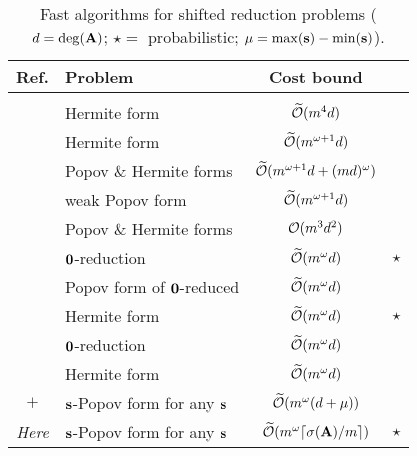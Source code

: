 \documentclass[preprint]{sig-alternate-05-2015}
\begin{document}
\begin{table}[h]
  \scriptsize
  \centering
  \begin{tabular}[h]{cp{3.1cm}cc}
    Ref.                 &  Problem             &  Cost bound                                                &                \\ \hline \\[-0.25cm]
    \cite{HafMcCur91}    & Hermite form         &  $\widetilde{\mathcal{O}}(m^4 d)$                                       &                \\
    \cite{StoLab96}      & Hermite form         &  $\widetilde{\mathcal{O}}(m^{\omega+1} d)$                          &                \\
    \cite{Villard96}     & Popov \& Hermite forms &  $\widetilde{\mathcal{O}}(m^{\omega+1} d + (m d)^\omega)$ &                \\
    \cite{Alekhnovich02,Alekhnovich05} 
                         & weak Popov form & $\widetilde{\mathcal{O}}(m^{\omega+1} d)$                                &                \\
    \cite{MulSto03}      & Popov \& Hermite forms & $\mathcal{O}(m^3 d^2)$                                     &                \\
    \cite{GiJeVi03}      & $\mathbf{0}$-reduction & $\widetilde{\mathcal{O}}(m^\omega d)$                              & $\star$        \\
    \cite{SarSto11}      & Popov form of $\mathbf{0}$-reduced & $\widetilde{\mathcal{O}}(m^\omega d)$                  &                \\
    \cite{GupSto11}      & Hermite form & $\widetilde{\mathcal{O}}(m^{\omega} d)$                                     & $\star$        \\
    \cite{GuSaStVa12}    & $\mathbf{0}$-reduction & $\widetilde{\mathcal{O}}(m^{\omega} d)$                            &                \\
    \cite{ZhoLab16}      & Hermite form & $\widetilde{\mathcal{O}}(m^{\omega} d)$                                     &                \\
    \cite{GuSaStVa12}$+$\cite{SarSto11}
                         & $\mathbf{s}$-Popov form for any $\mathbf{s}$ & $\widetilde{\mathcal{O}}(m^{\omega} (d+\mu))$     &                \\
    \emph{Here}          & $\mathbf{s}$-Popov form for any $\mathbf{s}$ &
                                                  $\softO{\rdim^{\expmatmul} \lceil \degDet/\rdim \rceil}$   & $\star$
  \end{tabular}
  \caption{Fast algorithms for shifted reduction problems \textmd{($d =
    \deg(\mat{A})$; $\star = $ probabilistic; $\mu = \max(\mathbf{s})-\min(\mathbf{s})$)}.}
    \label{tbl:cost_popov}
\vspace{-0.3cm}
\end{table}
\end{document}
